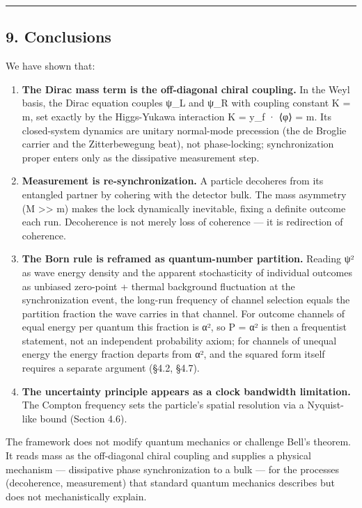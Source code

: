 \documentclass[
]{article}
\begin{document}
\begin{center}\rule{0.5\linewidth}{0.5pt}\end{center}

\subsection{9. Conclusions}\label{conclusions}

We have shown that:

\begin{enumerate}
\def\labelenumi{\arabic{enumi}.}
\item
  \textbf{The Dirac mass term is the off-diagonal chiral coupling.} In
  the Weyl basis, the Dirac equation couples ψ\_L and ψ\_R with coupling
  constant K = m, set exactly by the Higgs-Yukawa interaction K = y\_f ·
  ⟨φ⟩ = m. Its closed-system dynamics are unitary normal-mode precession
  (the de Broglie carrier and the Zitterbewegung beat), not
  phase-locking; synchronization proper enters only as the dissipative
  measurement step.
\item
  \textbf{Measurement is re-synchronization.} A particle decoheres from
  its entangled partner by cohering with the detector bulk. The mass
  asymmetry (M \textgreater\textgreater{} m) makes the lock dynamically
  inevitable, fixing a definite outcome each run. Decoherence is not
  merely loss of coherence --- it is redirection of coherence.
\item
  \textbf{The Born rule is reframed as quantum-number partition.}
  Reading \textbar ψ\textbar² as wave energy density and the apparent
  stochasticity of individual outcomes as unbiased zero-point + thermal
  background fluctuation at the synchronization event, the long-run
  frequency of channel selection equals the partition fraction the wave
  carries in that channel. For outcome channels of equal energy per
  quantum this fraction is \textbar α\textbar², so P =
  \textbar α\textbar² is then a frequentist statement, not an
  independent probability axiom; for channels of unequal energy the
  energy fraction departs from \textbar α\textbar², and the squared form
  itself requires a separate argument (§4.2, §4.7).
\item
  \textbf{The uncertainty principle appears as a clock bandwidth
  limitation.} The Compton frequency sets the particle's spatial
  resolution via a Nyquist-like bound (Section 4.6).
\end{enumerate}

The framework does not modify quantum mechanics or challenge Bell's
theorem. It reads mass as the off-diagonal chiral coupling and supplies
a physical mechanism --- dissipative phase synchronization to a bulk ---
for the processes (decoherence, measurement) that standard quantum
mechanics describes but does not mechanistically explain.
\end{document}
